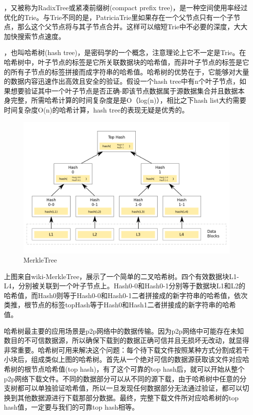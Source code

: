 \documentclass[UTF8]{ctexart}
\begin{document}
，又被称为RadixTree或紧凑前缀树(compact prefix tree)，是一种空间使用率经过优化的Trie。与Trie不同的是，PatriciaTrie里如果存在一个父节点只有一个子节点，那么这个父节点将与其子节点合并。这样可以缩短Trie中不必要的深度，大大加快搜索节点速度。

，也叫哈希树(hash tree)，是密码学的一个概念，注意理论上它不一定是Trie。在哈希树中，叶子节点的标签是它所关联数据块的哈希值，而非叶子节点的标签是它的所有子节点的标签拼接而成字符串的哈希值。哈希树的优势在于，它能够对大量的数据内容迅速作出高效且安全的验证。假设一个hash tree中有n个叶子节点，如果想要验证其中一个叶子节点是否正确-即该节点数据属于源数据集合并且数据本身完整，所需哈希计算的时间复杂度是是O（log(n)），相比之下hash list大约需要时间复杂度O(n)的哈希计算，hash tree的表现无疑是优秀的。

\begin{figure}
	\centering
	\includegraphics[scale=0.45]{merkletree.png}
	\caption{MerkleTree}
	\label{merkleTree}
\end{figure}

上图来自wiki-MerkleTree，展示了一个简单的二叉哈希树。四个有效数据块L1-L4，分别被关联到一个叶子节点上。Hash0-0和Hash0-1分别等于数据块L1和L2的哈希值，而Hash0则等于Hash0-0和Hash0-1二者拼接成的新字符串的哈希值，依次类推，根节点的标签topHash等于Hash0和Hash1二者拼接成的新字符串的哈希值。

哈希树最主要的应用场景是p2p网络中的数据传输。因为p2p网络中可能存在未知数目的不可信数据源，所以确保下载到的数据正确可信并且无损坏无改动，就显得非常重要。哈希树可用来解决这个问题：每个待下载文件按照某种方式分割成若干小块后，组成类似上图的哈希树。首先从一个绝对可信的数据源获取该文件对应哈希树的根节点哈希值(top hash)，有了这个可靠的top hash后，就可以开始从整个p2p网络下载文件。不同的数据部分可以从不同的源下载，由于哈希树中任意的分支树都可以单独验证哈希值，所以一旦发现任何数据部分无法通过验证，都可以切换到其他数据源进行下载那部分数据。最终，完整下载文件所对应哈希树的top hash值，一定要与我们的可靠top hash相等。
\end{document}
